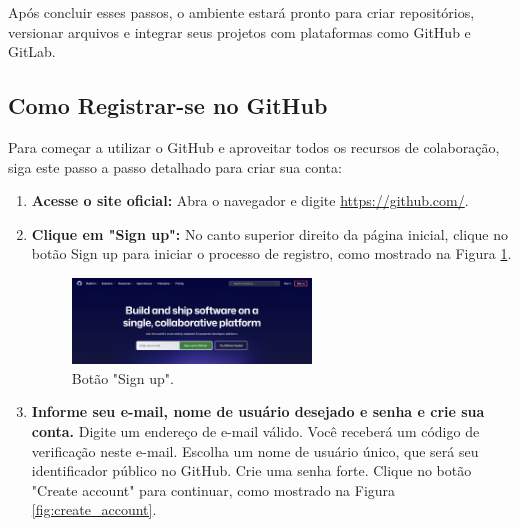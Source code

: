 Após concluir esses passos, o ambiente estará pronto para criar repositórios, versionar arquivos e integrar seus projetos com plataformas como GitHub e GitLab.


\subsection{Como Registrar-se no GitHub}


Para começar a utilizar o GitHub e aproveitar todos os recursos de colaboração, siga este passo a passo detalhado para criar sua conta:

\begin{enumerate}
    \item \textbf{Acesse o site oficial:}  
    Abra o navegador e digite \url{https://github.com/}.

    \item \textbf{Clique em "Sign up":}  
    No canto superior direito da página inicial, clique no botão Sign up para iniciar o processo de registro, como mostrado na Figura \ref{fig:sign_up}.

    \begin{figure}[H]
\centering
\includegraphics[width=0.6\textwidth]{imgs/tutorial_criar_conta_github/1_sign_up.png}
\caption{Botão "Sign up".}
\label{fig:sign_up}
\end{figure}

    \item \textbf{Informe seu e-mail, nome de usuário desejado e senha e crie sua conta.}  
    Digite um endereço de e-mail válido. Você receberá um código de verificação neste e-mail. Escolha um nome de usuário único, que será seu identificador público no GitHub. Crie uma senha forte. Clique no botão "Create account" para continuar, como mostrado na Figura \ref{fig:create_account}.
    

\end{enumerate}
